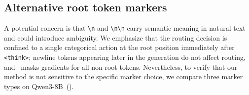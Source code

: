 \subsection{Alternative root token markers}
\label{sec:marker_comparison}

A potential concern is that \texttt{\textbackslash n} and \texttt{\textbackslash n\textbackslash n} carry semantic meaning in natural text and could introduce ambiguity. We emphasize that the routing decision is confined to a single categorical action at the root position immediately after \texttt{<think>}; newline tokens appearing later in the generation do not affect routing, and \Ours~masks gradients for all non-root tokens. Nevertheless, to verify that our method is not sensitive to the specific marker choice, we compare three marker types on Qwen3-8B~().

\begin{table}[h]
\centering
\small
{}
\caption{Comparison of root token marker types on Qwen3-8B after +\Ours. \textit{Newline fork} uses \texttt{\textbackslash n} vs.\ \texttt{\textbackslash n\textbackslash n}. \textit{Prefix sentence A/B} use distinct instructional prefixes ($\sim$20--30 tokens) prepended before \texttt{<think>} to distinguish modes. 
}
\label{tab:marker_comparison}
\end{table}

